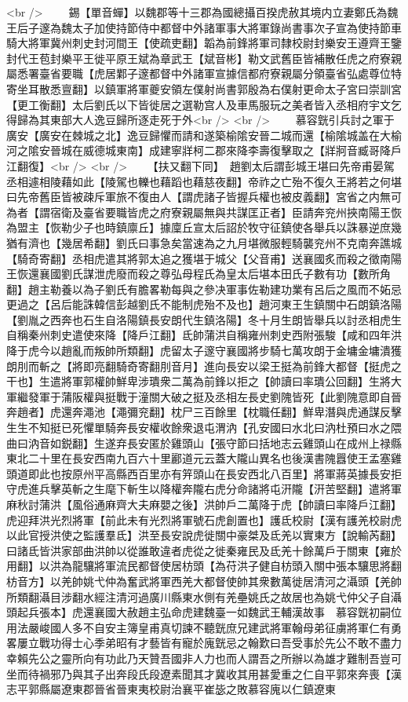 <br />
　　錫【單音蟬】以魏郡等十三郡為國總攝百揆虎赦其境内立妻鄭氏為魏王后子邃為魏太子加使持節侍中都督中外諸軍事大將軍錄尚書事次子宣為使持節車騎大將軍冀州刺史封河間王【使疏吏翻】韜為前鋒將軍司隸校尉封樂安王遵齊王鑒封代王苞封樂平王徙平原王斌為章武王【斌音彬】勒文武舊臣皆補散任虎之府寮親屬悉署臺省要職【虎居鄴子邃都督中外諸軍宣據信都府寮親屬分領臺省弘處尊位特寄坐耳散悉亶翻】以鎮軍將軍夔安領左僕射尚書郭殷為右僕射更命太子宮曰崇訓宮【更工衡翻】太后劉氏以下皆徙居之選勒宫人及車馬服玩之美者皆入丞相府宇文乞得歸為其東部大人逸豆歸所逐走死于外<br />
<br />
　　慕容皝引兵討之軍于廣安【廣安在棘城之北】逸豆歸懼而請和遂築榆隂安晉二城而還【榆隂城盖在大榆河之隂安晉城在威德城東南】成建寧牂柯二郡來降李壽復擊取之【牂牁音臧哥降戶江翻復】<br />
<br />
　　【扶又翻下同】　趙劉太后謂彭城王堪曰先帝甫晏駕丞相遽相陵藉如此【陵駕也轢也藉蹈也藉慈夜翻】帝祚之亡殆不復久王將若之何堪曰先帝舊臣皆被疎斥軍旅不復由人【謂虎諸子皆握兵權也被皮義翻】宮省之内無可為者【謂宿衛及臺省要職皆虎之府寮親屬無與共謀匡正者】臣請奔兖州挾南陽王恢為盟主【恢勒少子也時鎮廪丘】據廩丘宣太后詔於牧守征鎮使各舉兵以誅暴逆庶幾猶有濟也【幾居希翻】劉氏曰事急矣當速為之九月堪微服輕騎襲兖州不克南奔譙城【騎奇寄翻】丞相虎遣其將郭太追之獲堪于城父【父音甫】送襄國炙而殺之徵南陽王恢還襄國劉氏謀泄虎廢而殺之尊弘母程氏為皇太后堪本田氏子數有功【數所角翻】趙主勒養以為子劉氏有膽畧勒每與之參决軍事佐勒建功業有呂后之風而不妬忌更過之【呂后能誅韓信彭越劉氏不能制虎殆不及也】趙河東王生鎮關中石朗鎮洛陽【劉胤之西奔也石生自洛陽鎮長安朗代生鎮洛陽】冬十月生朗皆舉兵以討丞相虎生自稱秦州刺史遣使來降【降戶江翻】氐帥蒲洪自稱雍州刺史西附張駿【咸和四年洪降于虎今以趙亂而叛帥所類翻】虎留太子邃守襄國將步騎七萬攻朗于金墉金墉潰獲朗刖而斬之【將即亮翻騎奇寄翻刖音月】進向長安以梁王挺為前鋒大都督【挺虎之干也】生遣將軍郭權帥鮮卑涉璝衆二萬為前鋒以拒之【帥讀曰率璝公回翻】生將大軍繼發軍于蒲阪權與挺戰于潼關大破之挺及丞相左長史劉隗皆死【此劉隗意即自晉奔趙者】虎還奔澠池【澠彌兖翻】枕尸三百餘里【枕職任翻】鮮卑潛與虎通謀反擊生生不知挺已死懼單騎奔長安權收餘衆退屯渭汭【孔安國曰水北曰汭杜預曰水之隈曲曰汭音如鋭翻】生遂弃長安匿於雞頭山【張守節曰括地志云雞頭山在成州上禄縣東北二十里在長安西南九百六十里酈道元云蓋大隴山異名也後漢書隗囂使王孟塞雞頭道即此也按原州平高縣西百里亦有笄頭山在長安西北八百里】將軍蔣英據長安拒守虎進兵擊英斬之生麾下斬生以降權奔隴右虎分命諸將屯汧隴【汧苦堅翻】遣將軍麻秋討蒲洪【風俗通麻齊大夫麻嬰之後】洪帥戶二萬降于虎【帥讀曰率降戶江翻】虎迎拜洪光烈將軍【前此未有光烈將軍號石虎創置也】護氐校尉【漢有護羌校尉虎以此官授洪使之監護羣氐】洪至長安說虎徙關中豪桀及氐羌以實東方【說輸芮翻】曰諸氐皆洪家部曲洪帥以從誰敢違者虎從之徙秦雍民及氐羌十餘萬戶于關東【雍於用翻】以洪為龍驤將軍流民都督使居枋頭【為苻洪子健自枋頭入關中張本驤思將翻枋音方】以羌帥姚弋仲為奮武將軍西羌大都督使帥其衆數萬徙居清河之灄頭【羌帥所類翻灄目涉翻水經注清河過廣川縣東水側有羌壘姚氏之故居也為姚弋仲父子自灄頭起兵張本】虎還襄國大赦趙主弘命虎建魏臺一如魏武王輔漢故事　慕容皝初嗣位用法嚴峻國人多不自安主簿皇甫真切諫不聽皝庶兄建武將軍翰母弟征虜將軍仁有勇畧屢立戰功得士心季弟昭有才藝皆有寵於廆皝忌之翰歎曰吾受事於先公不敢不盡力幸賴先公之靈所向有功此乃天贊吾國非人力也而人謂吾之所辦以為雄才難制吾豈可坐而待禍邪乃與其子出奔段氏段遼素聞其才冀收其用甚愛重之仁自平郭來奔喪【漢志平郭縣屬遼東郡晉省晉東夷校尉治襄平崔毖之敗慕容廆以仁鎮遼東